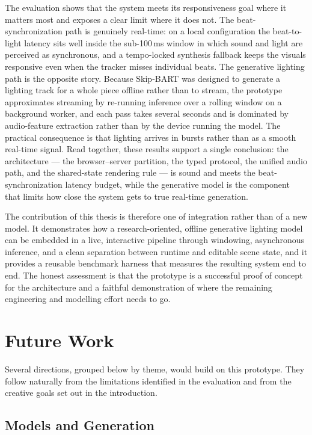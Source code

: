 The evaluation shows that the system meets its responsiveness goal where it matters most and exposes a clear limit where it does not. The beat-synchronization path is genuinely real-time: on a local configuration the beat-to-light latency sits well inside the sub-100\,ms window in which sound and light are perceived as synchronous, and a tempo-locked synthesis fallback keeps the visuals responsive even when the tracker misses individual beats. The generative lighting path is the opposite story. Because Skip-BART was designed to generate a lighting track for a whole piece offline rather than to stream, the prototype approximates streaming by re-running inference over a rolling window on a background worker, and each pass takes several seconds and is dominated by audio-feature extraction rather than by the device running the model. The practical consequence is that lighting arrives in bursts rather than as a smooth real-time signal. Read together, these results support a single conclusion: the architecture --- the browser--server partition, the typed protocol, the unified audio path, and the shared-state rendering rule --- is sound and meets the beat-synchronization latency budget, while the generative model is the component that limits how close the system gets to true real-time generation.

The contribution of this thesis is therefore one of integration rather than of a new model. It demonstrates how a research-oriented, offline generative lighting model can be embedded in a live, interactive pipeline through windowing, asynchronous inference, and a clean separation between runtime and editable scene state, and it provides a reusable benchmark harness that measures the resulting system end to end. The honest assessment is that the prototype is a successful proof of concept for the architecture and a faithful demonstration of where the remaining engineering and modelling effort needs to go.

\section{Future Work}

Several directions, grouped below by theme, would build on this prototype. They follow naturally from the limitations identified in the evaluation and from the creative goals set out in the introduction.

\subsection{Models and Generation}

